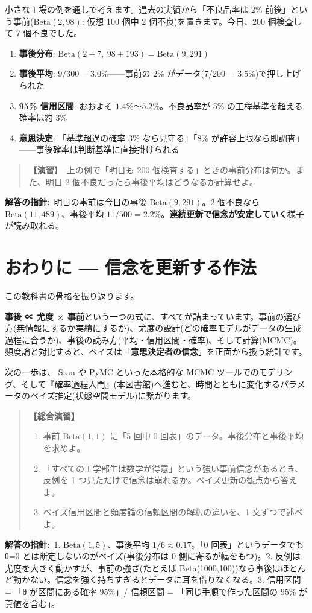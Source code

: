 \documentclass{article}
\begin{document}
小さな工場の例を通しで考えます。過去の実績から「不良品率は 2\% 前後」という事前(\(\mathrm{Beta}(2, 98)\): 仮想 100 個中 2 個不良)を置きます。今日、200 個検査して 7 個不良でした。

\begin{enumerate}
\item \textbf{事後分布}: \(\mathrm{Beta}(2 + 7,\ 98 + 193) = \mathrm{Beta}(9, 291)\)
\item \textbf{事後平均}: \(9/300 = 3.0\%\)——事前の 2\% がデータ(7/200 = 3.5\%)で押し上げられた
\item \textbf{95\% 信用区間}: おおよそ \(1.4\%\)〜\(5.2\%\)。不良品率が 5\% の工程基準を超える確率は約 3\%
\item \textbf{意思決定}: 「基準超過の確率 3\% なら見守る」「8\% が許容上限なら即調査」——事後確率は判断基準に直接掛けられる
\end{enumerate}

\begin{quote}
\textbf{【演習】}\ 上の例で「明日も 200 個検査する」ときの事前分布は何か。また、明日 2 個不良だったら事後平均はどうなるか計算せよ。
\end{quote}

\textbf{解答の指針:}\ 明日の事前は今日の事後 \(\mathrm{Beta}(9, 291)\)。2 個不良なら \(\mathrm{Beta}(11, 489)\)、事後平均 \(11/500 = 2.2\%\)。\textbf{連続更新で信念が安定していく}様子が読み取れる。

\section{おわりに — 信念を更新する作法}

この教科書の骨格を振り返ります。

\textbf{事後 ∝ 尤度 × 事前}という一つの式に、すべてが詰まっています。事前の選び方(無情報にするか実績にするか)、尤度の設計(どの確率モデルがデータの生成過程に合うか)、事後の読み方(平均・信用区間・確率)、そして計算(MCMC)。頻度論と対比すると、ベイズは「\textbf{意思決定者の信念}」を正面から扱う統計です。

次の一歩は、 Stan や PyMC といった本格的な MCMC ツールでのモデリング、そして『確率過程入門』(本図書館)へ進むと、時間とともに変化するパラメータのベイズ推定(状態空間モデル)に繋がります。

\begin{quote}
\textbf{【総合演習】}
\begin{enumerate}
\item 事前 \(\mathrm{Beta}(1, 1)\) に「5 回中 0 回表」のデータ。事後分布と事後平均を求めよ。
\item 「すべての工学部生は数学が得意」という強い事前信念があるとき、反例を 1 つ見ただけで信念は崩れるか。ベイズ更新の観点から答えよ。
\item ベイズ信用区間と頻度論の信頼区間の解釈の違いを、1 文ずつで述べよ。
\end{enumerate}
\end{quote}

\textbf{解答の指針:}\ 1. \(\mathrm{Beta}(1, 5)\)、事後平均 \(1/6 \approx 0.17\)。「0 回表」というデータでも θ=0 とは断定しないのがベイズ(事後分布は 0 側に寄るが幅をもつ)。2. 反例は尤度を大きく動かすが、事前の強さ(たとえば Beta(1000,100))なら事後はほとんど動かない。信念を強く持ちすぎるとデータに耳を借りなくなる。3. 信用区間 = 「θ が区間にある確率 95\%」/ 信頼区間 = 「同じ手順で作った区間の 95\% が真値を含む」。
\end{document}
